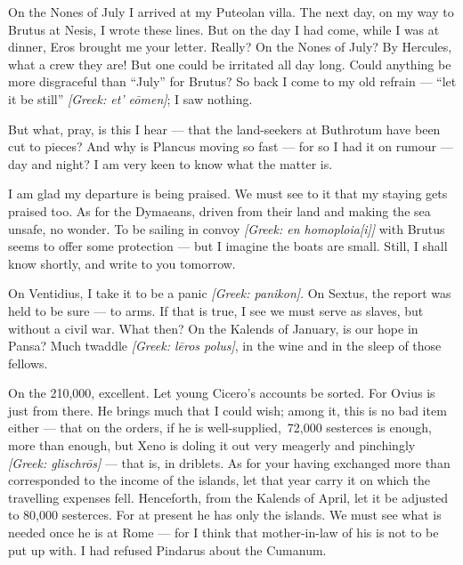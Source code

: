 

 On the Nones of July I arrived at my Puteolan villa. The next day, on my way to Brutus at Nesis, I wrote these lines. But on the day I had come, while I was at dinner, Eros brought me your letter. Really? On the Nones of July? By Hercules, what a crew they are! But one could be irritated all day long. Could anything be more disgraceful than ``July'' for Brutus? So back I come to my old refrain --- ``let it be still'' \textit{[Greek: et' e\=omen]}; I saw nothing.

 But what, pray, is this I hear --- that the land-seekers at Buthrotum have been cut to pieces? And why is Plancus moving so fast --- for so I had it on rumour --- day and night? I am very keen to know what the matter is.

 I am glad my departure is being praised. We must see to it that my staying gets praised too. As for the Dymaeans, driven from their land and making the sea unsafe, no wonder. To be sailing in convoy \textit{[Greek: en homoploia{[i]}]} with Brutus seems to offer some protection --- but I imagine the boats are small. Still, I shall know shortly, and write to you tomorrow.

 On Ventidius, I take it to be a panic \textit{[Greek: panikon]}. On Sextus, the report was held to be sure --- \dag to arms\dag. If that is true, I see we must serve as slaves, but without a civil war. What then? On the Kalends of January, is our hope in Pansa? Much twaddle \textit{[Greek: l\=eros polus]}, in the wine and in the sleep of those fellows.

 On the 210,000, excellent. Let young Cicero's accounts be sorted. For Ovius is just from there. He brings much that I could wish; among it, this is no bad item either --- \dag that on the orders, if he is well-supplied,\dag\ 72,000 sesterces is enough, more than enough, but Xeno is doling it out very meagerly and pinchingly \textit{[Greek: glischr\=os]} --- that is, in driblets. As for your having exchanged more than corresponded to the income of the islands, let that year carry it on which the travelling expenses fell. Henceforth, from the Kalends of April, let it be adjusted to 80,000 sesterces. For at present he has only the islands. We must see what is needed once he is at Rome --- for I think that mother-in-law of his is not to be put up with. I had refused Pindarus about the Cumanum.

